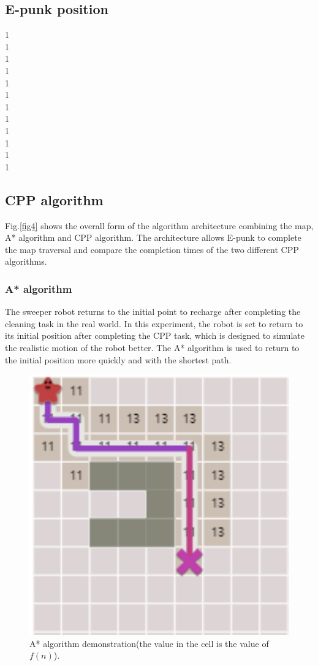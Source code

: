 \documentclass[conference]{IEEEtran}
\begin{document}
\subsection{E-punk position}

1\\
1\\
1\\
1\\
1\\
1\\
1\\
1\\
1\\
1\\
1\\
1

\subsection{CPP algorithm}
 Fig.\ref{fig4} shows the overall form of the algorithm architecture combining the map, A* algorithm and CPP algorithm. The architecture allows E-punk to complete the map traversal and compare the completion times of the two different CPP algorithms.
 
\subsubsection{A* algorithm}
The sweeper robot returns to the initial point to recharge after completing the cleaning task in the real world. In this experiment, the robot is set to return to its initial position after completing the CPP task, which is designed to simulate the realistic motion of the robot better. The A* algorithm\cite{hart1968formal} is used to return to the initial position more quickly and with the shortest path.\\

\begin{figure}[htbp]
\centerline{\includegraphics[scale=0.45]{RS_Report/astar.png}}
\caption{A* algorithm demonstration(the value in the cell is the value of $f(n)$).}
\label{fig3}
\end{figure}
\end{document}
